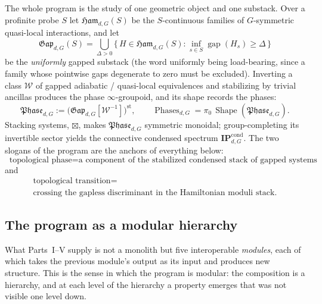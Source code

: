 \documentclass[12pt]{article}
\newcommand{\Shape}{\operatorname{Shape}}      %
\newcommand{\Ham}{\mathfrak{Ham}}              %
\newcommand{\Gap}{\mathfrak{Gap}}              %
\newcommand{\Phase}{\mathfrak{Phase}}          %
\newcommand{\Phases}{\operatorname{Phases}}    %
\newcommand{\Weq}{\mathcal{W}}                 %
\newcommand{\st}{\mathrm{st}}                  %
\newcommand{\gapof}[1]{\operatorname{gap}(#1)} %
\newcommand{\gapbound}{\Delta}                  %
\newcommand{\IPcond}{\mathbf{IP}^{\mathrm{cond}}}  %
\newcommand{\set}[1]{\{\,#1\,\}}
\DeclareMathOperator*{\einf}{inf}
\theoremstyle{plain}
\theoremstyle{definition}
\theoremstyle{remark}
\begin{document}
The whole program is the study of one geometric object and one substack. Over a
profinite probe $S$ let $\Ham_{d,G}(S)$ be the $S$-continuous families of
$G$-symmetric quasi-local interactions, and let
\begin{equation}
\label{eq:gapdef}
\Gap_{d,G}(S)=\bigcup_{\gapbound>0}\set{H\in\Ham_{d,G}(S):\einf_{s\in S}\gapof{H_s}\ge\gapbound}
\end{equation}
be the \emph{uniformly} gapped substack (the word uniformly being load-bearing, since
a family whose pointwise gaps degenerate to zero must be excluded). Inverting a class
$\Weq$ of gapped adiabatic / quasi-local equivalences and stabilizing by trivial
ancillas produces the phase $\infty$-groupoid, and its shape records the phases:
\begin{equation}
\label{eq:phase}
\Phase_{d,G}:=\bigl(\Gap_{d,G}[\Weq^{-1}]\bigr)^{\st},
\qquad
\Phases_{d,G}=\pi_0\,\Shape(\Phase_{d,G}).
\end{equation}
Stacking systems, $\boxtimes$, makes $\Phase_{d,G}$ symmetric monoidal; group-completing
its invertible sector yields the connective condensed spectrum $\IPcond_{d,G}$. The two
slogans of the program are the anchors of everything below:
\begin{equation}
\label{eq:slogans}
\boxed{\;\text{topological phase}=\text{a component of the stabilized condensed stack of gapped systems}\;}
\end{equation}
and
\begin{equation}
\label{eq:slogan2}
\boxed{\;
\begin{array}{c}
\text{topological transition}={}\\[2pt]
\text{crossing the gapless discriminant in the Hamiltonian moduli stack}.
\end{array}
\;}
\end{equation}

\subsection{The program as a modular hierarchy}
\label{sec:modular}

What Parts~I--V supply is not a monolith but five interoperable \emph{modules}, each of
which takes the previous module's output as its input and produces new structure. This
is the sense in which the program is modular: the composition is a hierarchy, and at
each level of the hierarchy a property emerges that was not visible one level down.
\end{document}
